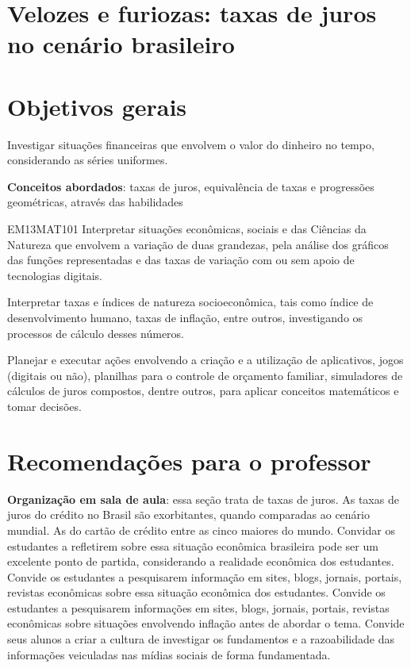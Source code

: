 \begin{paginatexto2}
\section*{Velozes e furiozas: taxas de juros no cenário brasileiro}
\section*{Objetivos gerais}

Investigar situações financeiras que envolvem o valor do dinheiro no tempo, considerando as séries uniformes.

\textbf{Conceitos abordados}: taxas de juros, equivalência de taxas e progressões geométricas, através das habilidades

\begin{objetivos}{EM13MAT101}
 Interpretar situações econômicas, sociais e das Ciências da Natureza
que envolvem a variação de duas grandezas, pela análise dos gráficos das funções representadas e das taxas de variação com ou sem apoio de tecnologias digitais.


Interpretar taxas e índices de natureza socioeconômica, tais como índice de desenvolvimento humano, taxas de inflação, entre outros, investigando os processos de cálculo desses números.

Planejar e executar ações envolvendo a criação e a utilização de aplicativos, jogos (digitais ou não), planilhas para o controle de orçamento familiar, simuladores de cálculos de juros compostos, dentre outros, para aplicar conceitos matemáticos e tomar decisões. 

\end{objetivos}

\section*{Recomendações para o professor}

\textbf{Organização em sala de aula}: essa seção trata de taxas de juros. As taxas de juros do crédito no Brasil são exorbitantes, quando comparadas ao cenário mundial. As do cartão de crédito entre as cinco maiores do mundo. Convidar os estudantes a refletirem sobre essa situação econômica brasileira pode ser um excelente ponto de partida, considerando a realidade econômica dos estudantes. Convide os estudantes a pesquisarem informação em sites, blogs, jornais, portais, revistas econômicas sobre essa situação econômica dos estudantes. Convide os estudantes a pesquisarem informações em sites, blogs, jornais, portais, revistas econômicas sobre situações envolvendo inflação antes de abordar o tema. Convide seus alunos a criar a cultura de investigar os fundamentos e a razoabilidade das informações veiculadas nas mídias sociais de forma fundamentada.


\end{paginatexto2}

